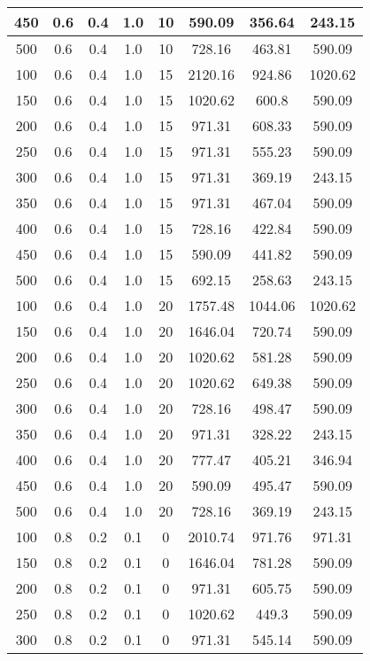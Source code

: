 \documentclass[a4paper, 12pt]{extreport}
\begin{document}
\begin{itemize}
\begin{longtable}{|c|c|c|c|c|c|c|c|}
			450 & 0.6 & 0.4 & 1.0 & 10 & 590.09 & 356.64 & 243.15 \\\hline
			500 & 0.6 & 0.4 & 1.0 & 10 & 728.16 & 463.81 & 590.09 \\\hline
			100 & 0.6 & 0.4 & 1.0 & 15 & 2120.16 & 924.86 & 1020.62 \\\hline
			150 & 0.6 & 0.4 & 1.0 & 15 & 1020.62 & 600.8 & 590.09 \\\hline
			200 & 0.6 & 0.4 & 1.0 & 15 & 971.31 & 608.33 & 590.09 \\\hline
			250 & 0.6 & 0.4 & 1.0 & 15 & 971.31 & 555.23 & 590.09 \\\hline
			300 & 0.6 & 0.4 & 1.0 & 15 & 971.31 & 369.19 & 243.15 \\\hline
			350 & 0.6 & 0.4 & 1.0 & 15 & 971.31 & 467.04 & 590.09 \\\hline
			400 & 0.6 & 0.4 & 1.0 & 15 & 728.16 & 422.84 & 590.09 \\\hline
			450 & 0.6 & 0.4 & 1.0 & 15 & 590.09 & 441.82 & 590.09 \\\hline
			500 & 0.6 & 0.4 & 1.0 & 15 & 692.15 & 258.63 & 243.15 \\\hline
			100 & 0.6 & 0.4 & 1.0 & 20 & 1757.48 & 1044.06 & 1020.62 \\\hline
			150 & 0.6 & 0.4 & 1.0 & 20 & 1646.04 & 720.74 & 590.09 \\\hline
			200 & 0.6 & 0.4 & 1.0 & 20 & 1020.62 & 581.28 & 590.09 \\\hline
			250 & 0.6 & 0.4 & 1.0 & 20 & 1020.62 & 649.38 & 590.09 \\\hline
			300 & 0.6 & 0.4 & 1.0 & 20 & 728.16 & 498.47 & 590.09 \\\hline
			350 & 0.6 & 0.4 & 1.0 & 20 & 971.31 & 328.22 & 243.15 \\\hline
			400 & 0.6 & 0.4 & 1.0 & 20 & 777.47 & 405.21 & 346.94 \\\hline
			450 & 0.6 & 0.4 & 1.0 & 20 & 590.09 & 495.47 & 590.09 \\\hline
			500 & 0.6 & 0.4 & 1.0 & 20 & 728.16 & 369.19 & 243.15 \\\hline
			100 & 0.8 & 0.2 & 0.1 & 0 & 2010.74 & 971.76 & 971.31 \\\hline
			150 & 0.8 & 0.2 & 0.1 & 0 & 1646.04 & 781.28 & 590.09 \\\hline
			200 & 0.8 & 0.2 & 0.1 & 0 & 971.31 & 605.75 & 590.09 \\\hline
			250 & 0.8 & 0.2 & 0.1 & 0 & 1020.62 & 449.3 & 590.09 \\\hline
			300 & 0.8 & 0.2 & 0.1 & 0 & 971.31 & 545.14 & 590.09 \\\hline

\end{longtable}
\end{itemize}
\end{document}
